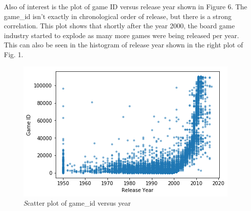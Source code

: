 \documentclass[12pt]{article}
\begin{document}
Also of interest is the plot of game ID versus release year shown in Figure 6. The game\_id isn't exactly in chronological order of release, but there is a strong correlation. This plot shows that shortly after the year 2000, the board game industry started to explode as many more games were being released per year. This can also be seen in the histogram of release year shown in the right plot of Fig. 1. 

\begin{figure}[ht]
\centering
\includegraphics{market_id_year.png}
\caption{\small \textit Scatter plot of game\_id versus year}
\end{figure}
\end{document}
